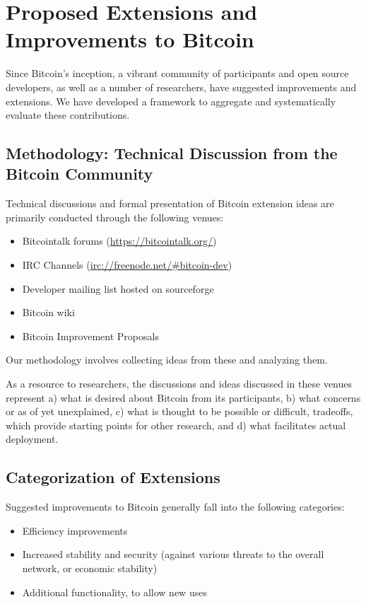 \section{ Proposed Extensions and Improvements to Bitcoin}

Since Bitcoin's inception, a vibrant community of participants and open source developers, as well as a number of researchers, have suggested improvements and extensions. We have developed a framework to aggregate and systematically evaluate these contributions.

\subsection{ Methodology: Technical Discussion from the Bitcoin Community}
Technical discussions and formal presentation of Bitcoin extension ideas are primarily conducted through the following venues:
\begin{itemize}
\item Bitcointalk forums (\url{https://bitcointalk.org/})
\item IRC Channels (\url{irc://freenode.net/#bitcoin-dev})
\item Developer mailing list hosted on sourceforge
\item Bitcoin wiki
\item Bitcoin Improvement Proposals
\end{itemize}
Our methodology involves collecting ideas from these and analyzing them.

As a resource to researchers, the discussions and ideas discussed in these venues represent a) what is desired about Bitcoin from its participants, b) what concerns or as of yet unexplained, c) what is thought to be possible or difficult, tradeoffs, which provide starting points for other research, and d) what facilitates actual deployment.

\subsection{Categorization of Extensions}

Suggested improvements to Bitcoin generally fall into the following categories:
\begin{itemize}
\item Efficiency improvements
\item Increased stability and security (against various threats to the overall network, or economic stability)
\item Additional functionality, to allow new uses
\end{itemize}

